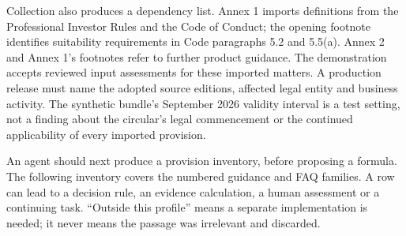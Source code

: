 Collection also produces a dependency list. Annex 1 imports definitions from the
Professional Investor Rules and the Code of Conduct; the opening footnote
identifies suitability requirements in Code paragraphs 5.2 and 5.5(a). Annex 2
and Annex 1's footnotes refer to further product guidance. The demonstration
accepts reviewed input assessments for these imported matters. A production
release must name the adopted source editions, affected legal entity and
business activity. The synthetic bundle's September 2026 validity interval is
a test setting, not a finding about the circular's legal commencement or the
continued applicability of every imported provision.

An agent should next produce a provision inventory, before proposing a formula.
The following inventory covers the numbered guidance and FAQ families. A row
can lead to a decision rule, an evidence calculation, a human assessment or a
continuing task. ``Outside this profile'' means a separate implementation is
needed; it never means the passage was irrelevant and discarded.

